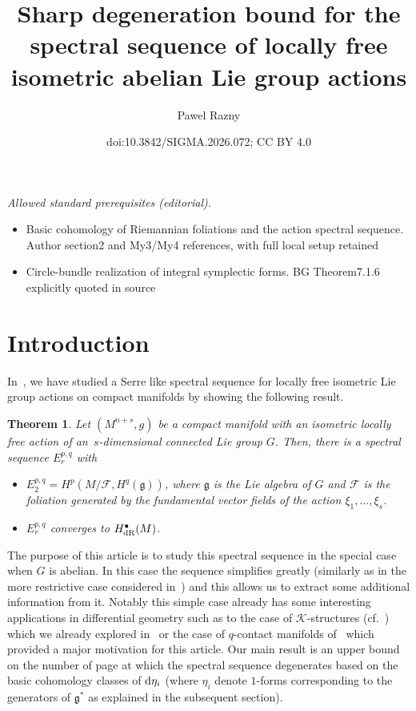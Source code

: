 \documentclass[10pt,a4paper]{amsart}
\title{Sharp degeneration bound for the spectral sequence of locally free isometric abelian Lie group actions}
\author{Pawel Razny}
\date{doi:10.3842/SIGMA.2026.072; CC BY 4.0}
\numberwithin{equation}{section}
\newtheorem{tw}{Theorem}[section]
\theoremstyle{definition}
\begin{document}
\maketitle
\noindent\textit{Allowed standard prerequisites (editorial).}\begin{itemize}
\item Basic cohomology of Riemannian foliations and the action spectral sequence. Author section2 and My3/My4 references, with full local setup retained
\item Circle-bundle realization of integral symplectic forms. BG Theorem7.1.6 explicitly quoted in source
\end{itemize}\medskip
\section{Introduction}
In~\cite{My4}, we have studied a Serre like spectral sequence for locally free isometric Lie group actions on compact manifolds by showing the following result.

\begin{tw}\label{RecG} Let $(M^{n+s},g)$ be a compact manifold with an isometric locally free action of an~$s$-dimensional connected Lie group $G$. Then, there is a spectral sequence $E^{p,q}_r$ with
\begin{itemize}\itemsep=0pt
\item $E^{p,q}_2=H^p(M\slash\mathcal{F}, H^{q}(\mathfrak{g}))$, where $\mathfrak{g}$ is the Lie algebra of $G$ and $\mathcal{F}$ is the foliation generated by the fundamental vector fields of the action $\xi_1,\dots,\xi_s$.
\item $E^{p,q}_r$ converges to $H^{\bullet}_{\rm dR}(M)$.
\end{itemize}
\end{tw}
The purpose of this article is to study this spectral sequence in the special case when $G$ is abelian. In this case the sequence simplifies greatly (similarly as in the more restrictive case considered in~\cite{My3}) and this allows us to extract some additional information from it. Notably this simple case already has some interesting applications in differential geometry such as to the case of $\mathcal{K}$-structures (cf.\ \cite{B}) which we already explored in~\cite{My3} or the case of $q$-contact manifolds of~\cite{F} which provided a major motivation for this article. Our main result is an upper bound on the number of page at which the spectral sequence degenerates based on the basic cohomology classes of ${\rm d}\eta_i$ (where $\eta_i$ denote $1$-forms corresponding to the generators of $\mathfrak{g}^*$ as explained in the subsequent section).
\end{document}
